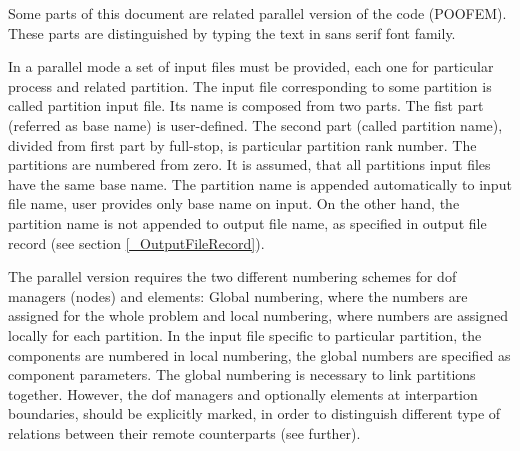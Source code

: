 \documentclass[draft]{article}
\newcommand{\Pmode}[1]{{\sffamily #1}}
\begin{document}
\Pmode{Some parts of this document are related parallel version of the code (POOFEM). These parts are distinguished by typing the text in sans serif font family.}
\Pmode{In a parallel mode a set of input files must be provided, each one for
particular process and related partition. The input file corresponding to some
partition is called partition input file. Its name is composed from two parts. The fist part (referred as base
name) is user-defined. The second part (called partition name), divided from first part by
full-stop, is particular partition rank number. The partitions are numbered
from zero. It is assumed, that all partitions input files have the
same base name. The partition name is appended automatically to input
file name, user provides only base name on input. On the other hand,
the partition name is not appended to output file name, as specified
in output file record (see section \ref{_OutputFileRecord}).

The parallel version requires the two different numbering schemes for
dof managers (nodes) and elements: Global numbering, where the numbers
are assigned for the whole problem and local numbering, where numbers
are assigned locally for each partition. In the input file specific to
particular partition, the components are numbered in local numbering,
the global numbers are specified as component parameters. The global
numbering is necessary to link partitions together. However, the dof
managers and optionally elements at interpartion boundaries, 
should be explicitly  marked, in order to distinguish different type
of relations between their remote counterparts (see further).}
\end{document}
